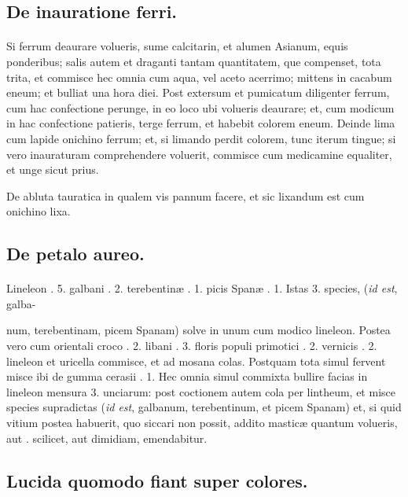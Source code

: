 \documentclass[a4paper, 11pt, oneside, polutonikogreek, italian]{article}
\begin{document}
\subsection{De inauratione ferri.}
\paragraph{}
Si ferrum deaurare volueris, sume calcitarin, et alumen Asianum, equis ponderibus; salis autem et draganti tantam quantitatem, que compenset, tota trita, et commisce hec omnia cum aqua, vel aceto acerrimo; mittens in cacabum eneum; et bulliat una hora diei. Post extersum et pumicatum diligenter ferrum, cum hac confectione perunge, in eo loco ubi volueris deaurare; et, cum modicum in hac confectione patieris, terge ferrum, et habebit colorem eneum. Deinde lima cum lapide onichino ferrum; et, si limando perdit colorem, tunc iterum tingue; si vero inauraturam comprehendere voluerit, commisce cum medicamine equaliter, et unge sicut prius.

De abluta tauratica in qualem vis pannum facere, et sic lixandum est cum onichino lixa.

\subsection{De petalo aureo.}
\paragraph{}
Lineleon \roundz. 5. galbani \roundz. 2. terebentinæ \roundz. 1. picis Spanæ \roundz. 1. Istas 3. species, (\emph{id est}, galba- 

num, terebentinam, picem Spanam) solve in unum cum modico lineleon. Postea vero cum orientali croco \roundz. 2. libani \roundz. 3. floris populi primotici \roundz. 2. vernicis \roundz. 2. lineleon et uricella commisce, et ad mosana colas. Postquam tota simul fervent misce ibi de gumma cerasii \roundz. 1. Hec omnia simul commixta bullire facias in lineleon mensura 3. unciarum: post coctionem autem cola per lintheum, et misce species supradictas (\emph{id est}, galbanum, terebentinum, et picem Spanam) et, si quid vitium postea habuerit, quo siccari non possit, addito masticæ quantum volueris, aut \roundz. scilicet, aut dimidiam, emendabitur.

\subsection{Lucida quomodo fiant super colores.}
\end{document}
